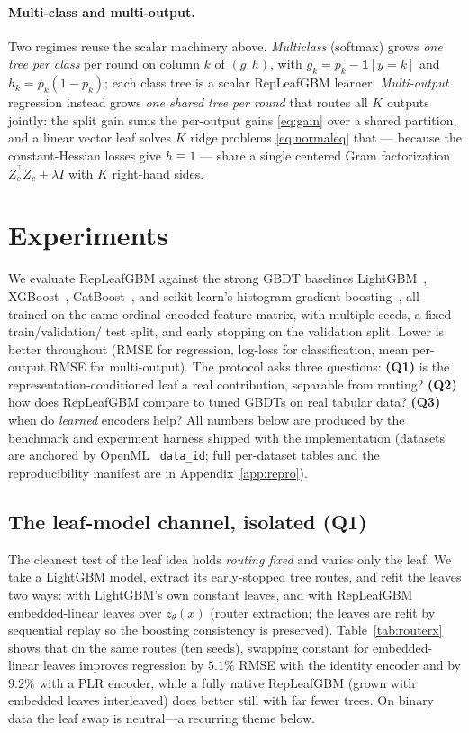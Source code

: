 \documentclass[11pt]{article}
\newcommand{\ind}[1]{\mathbf{1}\!\left[#1\right]}
\newcommand{\zt}{z_{\theta}}
\newcommand{\trans}{^{\top}}
\begin{document}
\paragraph{Multi-class and multi-output.}
Two regimes reuse the scalar machinery above. \emph{Multiclass} (softmax) grows
\emph{one tree per class} per round on column $k$ of $(g,h)$, with
$g_k = p_k - \ind{y=k}$ and $h_k = p_k(1-p_k)$; each class tree is a scalar
RepLeafGBM learner. \emph{Multi-output} regression instead grows \emph{one shared
tree per round} that routes all $K$ outputs jointly: the split gain sums the
per-output gains \eqref{eq:gain} over a shared partition, and a linear vector leaf
solves $K$ ridge problems \eqref{eq:normaleq} that --- because the constant-Hessian
losses give $h \equiv 1$ --- share a single centered Gram factorization
$Z_c^{\!\trans} Z_c + \lambda I$ with $K$ right-hand sides.

\section{Experiments}
\label{sec:experiments}

We evaluate RepLeafGBM against the strong GBDT baselines LightGBM~\citep{ke2017lightgbm},
XGBoost~\citep{chen2016xgboost}, CatBoost~\citep{prokhorenkova2018catboost}, and
scikit-learn's histogram gradient boosting~\citep{pedregosa2011scikit}, all trained on
the same ordinal-encoded feature matrix, with multiple seeds, a fixed train/validation/
test split, and early stopping on the validation split. Lower is better throughout
(RMSE for regression, log-loss for classification, mean per-output RMSE for
multi-output). The protocol asks three questions: \textbf{(Q1)} is the
representation-conditioned leaf a real contribution, separable from routing?
\textbf{(Q2)} how does RepLeafGBM compare to tuned GBDTs on real tabular data?
\textbf{(Q3)} when do \emph{learned} encoders help? All numbers below are produced by the
benchmark and experiment harness shipped with the implementation (datasets are anchored
by OpenML~\citep{vanschoren2014openml} \texttt{data\_id}; full per-dataset tables and the
reproducibility manifest are in Appendix~\ref{app:repro}).

\subsection{The leaf-model channel, isolated (Q1)}
\label{sec:exp-routerx}

The cleanest test of the leaf idea holds \emph{routing fixed} and varies only the leaf.
We take a LightGBM model, extract its early-stopped tree routes, and refit the leaves two
ways: with LightGBM's own constant leaves, and with RepLeafGBM embedded-linear leaves
over $\zt(x)$ (router extraction; the leaves are refit by sequential replay so the
boosting consistency is preserved). Table~\ref{tab:routerx} shows that on the same routes
(ten seeds), swapping constant for embedded-linear leaves improves regression by $5.1\%$
RMSE with the identity encoder and by $9.2\%$ with a PLR encoder, while a fully native
RepLeafGBM (grown with embedded leaves interleaved) does better still with far fewer
trees. On binary data the leaf swap is neutral---a recurring theme below.
\end{document}

